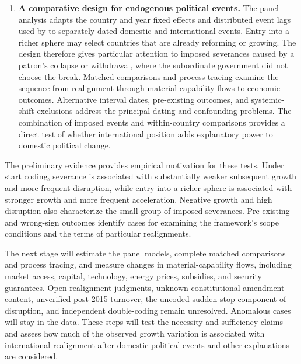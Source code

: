 \documentclass[11pt]{article}
\begin{document}
\begin{enumerate}[leftmargin=1.5em]
    \item \textbf{A comparative design for endogenous political events.} The panel analysis adapts the country and year fixed effects and distributed event lags used by \textcite{acemoglu_naidu_restrepo_robinson_2019} to separately dated domestic and international events. Entry into a richer sphere may select countries that are already reforming or growing. The design therefore gives particular attention to imposed severances caused by a patron's collapse or withdrawal, where the subordinate government did not choose the break. Matched comparisons and process tracing examine the sequence from realignment through material-capability flows to economic outcomes. Alternative interval dates, pre-existing outcomes, and systemic-shift exclusions address the principal dating and confounding problems. The combination of imposed events and within-country comparisons provides a direct test of whether international position adds explanatory power to domestic political change.
\end{enumerate}

The preliminary evidence provides empirical motivation for these tests. Under start coding, severance is associated with substantially weaker subsequent growth and more frequent disruption, while entry into a richer sphere is associated with stronger growth and more frequent acceleration. Negative growth and high disruption also characterize the small group of imposed severances. Pre-existing and wrong-sign outcomes identify cases for examining the framework's scope conditions and the terms of particular realignments.

The next stage will estimate the panel models, complete matched comparisons and process tracing, and measure changes in material-capability flows, including market access, capital, technology, energy prices, subsidies, and security guarantees. Open realignment judgments, unknown constitutional-amendment content, unverified post-2015 turnover, the uncoded sudden-stop component of disruption, and independent double-coding remain unresolved. Anomalous cases will stay in the data. These steps will test the necessity and sufficiency claims and assess how much of the observed growth variation is associated with international realignment after domestic political events and other explanations are considered.

\printbibliography
\end{document}
